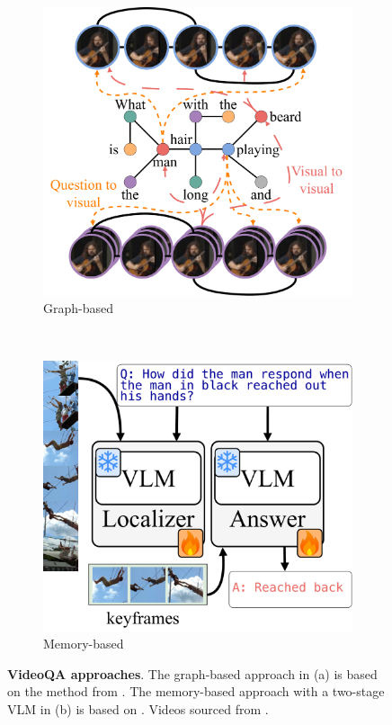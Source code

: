 \begin{figure}[t!]
    \centering
    \begin{subfigure}[t]{0.5\linewidth}
        \centering
        \includegraphics[width=\textwidth]{figs/graph_vqa.pdf}
        \caption{Graph-based}
    \end{subfigure}%
    ~ 
    \begin{subfigure}[t]{0.5\linewidth}
        \centering
        \includegraphics[width=\textwidth]{figs/vlm_vqa.pdf}
        \caption{Memory-based}
    \end{subfigure}
    \caption{\textbf{VideoQA approaches}. The graph-based approach in (a) is based on the method from . The memory-based approach with a two-stage VLM in (b) is based on . Videos sourced from .}
    \label{fig:videoqa}
\end{figure}



